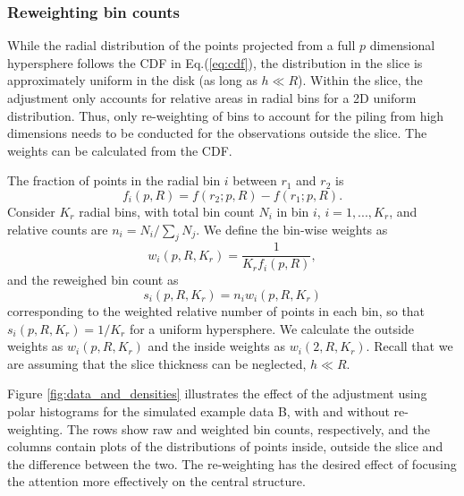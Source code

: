 \documentclass[]{interact}
\theoremstyle{plain}%
\theoremstyle{definition}
\theoremstyle{remark}
\begin{document}
\hypertarget{reweighting-bin-counts}{%
\subsubsection{Reweighting bin counts}\label{reweighting-bin-counts}}

While the radial distribution of the points projected from a full \(p\)
dimensional hypersphere follows the CDF in Eq.(\ref{eq:cdf}), the
distribution in the slice is approximately uniform in the disk (as long
as \(h \ll R\)). Within the slice, the adjustment only accounts for
relative areas in radial bins for a 2D uniform distribution. Thus, only
re-weighting of bins to account for the piling from high dimensions
needs to be conducted for the observations outside the slice. The
weights can be calculated from the CDF.

The fraction of points in the radial bin \(i\) between \(r_1\) and
\(r_2\) is \begin{equation}
f_{i}(p, R) = f(r_2; p, R) - f(r_1; p, R).
\label{eq:frac}
\end{equation} Consider \(K_r\) radial bins, with total bin count
\(N_i\) in bin \(i\), \(i = 1,...,K_r\), and relative counts are
\(n_i = N_i / \sum_j N_j\). We define the bin-wise weights as
\begin{equation}
w_i(p, R, K_r) = \frac{1}{K_r f_i(p,R)},
\end{equation} and the reweighed bin count as \begin{equation}
s_i(p, R, K_r) = n_i w_i(p, R, K_r)
\label{eq:reweight}
\end{equation} corresponding to the weighted relative number of points
in each bin, so that \(s_i(p,R,K_r) = 1/K_r\) for a uniform hypersphere.
We calculate the outside weights as \(w_i(p, R, K_r)\) and the inside
weights as \(w_i(2, R, K_r)\). Recall that we are assuming that the
slice thickness can be neglected, \(h\ll R\).

Figure \ref{fig:data_and_densities} illustrates the effect of the
adjustment using polar histograms for the simulated example data B, with
and without re-weighting. The rows show raw and weighted bin counts,
respectively, and the columns contain plots of the distributions of
points inside, outside the slice and the difference between the two. The
re-weighting has the desired effect of focusing the attention more
effectively on the central structure.
\end{document}
